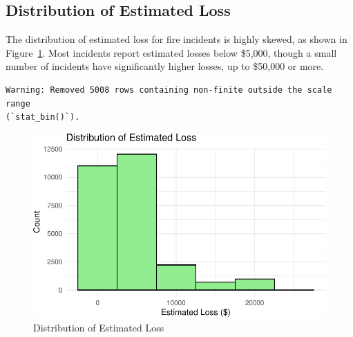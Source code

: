 \documentclass[
  letterpaper,
  DIV=11,
  numbers=noendperiod]{scrartcl}
\newenvironment{Shaded}{\begin{snugshade}}{\end{snugshade}}
\newcommand{\AttributeTok}[1]{\textcolor[rgb]{0.40,0.45,0.13}{#1}}
\newcommand{\DecValTok}[1]{\textcolor[rgb]{0.68,0.00,0.00}{#1}}
\newcommand{\FunctionTok}[1]{\textcolor[rgb]{0.28,0.35,0.67}{#1}}
\newcommand{\NormalTok}[1]{\textcolor[rgb]{0.00,0.23,0.31}{#1}}
\newcommand{\SpecialCharTok}[1]{\textcolor[rgb]{0.37,0.37,0.37}{#1}}
\newcommand{\StringTok}[1]{\textcolor[rgb]{0.13,0.47,0.30}{#1}}
\begin{document}
\hypertarget{distribution-of-estimated-loss}{%
\subsection{Distribution of Estimated
Loss}\label{distribution-of-estimated-loss}}

The distribution of estimated loss for fire incidents is highly skewed,
as shown in Figure~\ref{fig-estimated-loss}. Most incidents report
estimated losses below \$5,000, though a small number of incidents have
significantly higher losses, up to \$50,000 or more.

\begin{Shaded}
\end{Shaded}

\begin{verbatim}
Warning: Removed 5008 rows containing non-finite outside the scale range
(`stat_bin()`).
\end{verbatim}

\begin{figure}[H]

{\centering \includegraphics{paper_files/figure-pdf/fig-estimated-loss-1.pdf}

}

\caption{\label{fig-estimated-loss}Distribution of Estimated Loss}

\end{figure}
\end{document}

